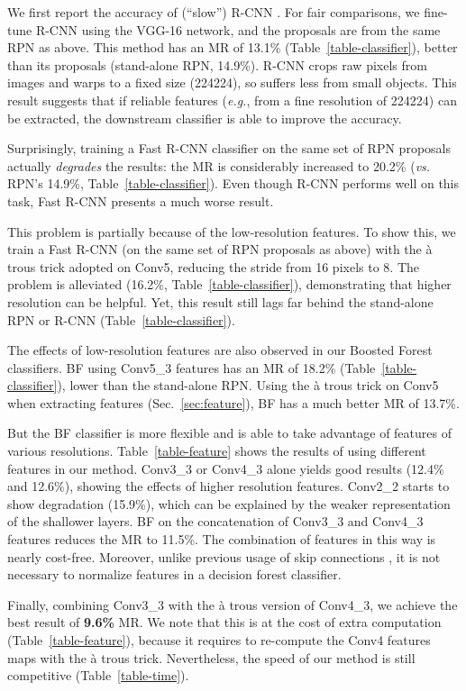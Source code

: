 \documentclass[runningheads]{llncs}
\def\eg{\emph{e.g.}}
\def\vs{\emph{vs. }}
\begin{document}
We first report the accuracy of (``slow'') R-CNN \cite{girshick2014rich}. For fair comparisons, we fine-tune R-CNN using the VGG-16 network, and the proposals are from the same RPN as above. This method has an MR of 13.1\% (Table~\ref{table-classifier}), better than its proposals (stand-alone RPN, 14.9\%). R-CNN crops raw pixels from images and warps to a fixed size (224224), so suffers less from small objects.
This result suggests that if reliable features (\eg, from a fine resolution of 224224) can be extracted, the downstream classifier is able to improve the accuracy. 

Surprisingly, training a Fast R-CNN classifier on the same set of RPN proposals actually \textit{degrades} the results: the MR is considerably increased to 20.2\% (\vs RPN's 14.9\%, Table~\ref{table-classifier}). Even though R-CNN performs well on this task, Fast R-CNN presents a much worse result.

This problem is partially because of the low-resolution features. To show this, we train a Fast R-CNN (on the same set of RPN proposals as above) with the \`a trous trick adopted on Conv5, reducing the stride from 16 pixels to 8. The problem is alleviated (16.2\%, Table~\ref{table-classifier}), demonstrating that higher resolution can be helpful. Yet, this result still lags far behind the stand-alone RPN or R-CNN (Table~\ref{table-classifier}).

The effects of low-resolution features are also observed in our Boosted Forest classifiers. BF using Conv5\_3 features has an MR of 18.2\% (Table~\ref{table-classifier}), lower than the stand-alone RPN. Using the \`a trous trick on Conv5 when extracting features (Sec.~\ref{sec:feature}), BF has a much better MR of 13.7\%.

But the BF classifier is more flexible and is able to take advantage of features of various resolutions. Table~\ref{table-feature} shows the results of using different features in our method.
Conv3\_3 or Conv4\_3 alone yields good results (12.4\% and 12.6\%), showing the effects of higher resolution features. Conv2\_2 starts to show degradation (15.9\%), which can be explained by the weaker representation of the shallower layers. 
BF on the concatenation of Conv3\_3 and Conv4\_3 features reduces the MR to 11.5\%. The combination of features in this way is nearly cost-free. Moreover, unlike previous usage of skip connections \cite{liu2015parsenet}, it is not necessary to normalize features in a decision forest classifier. 

Finally, combining Conv3\_3 with the \`a trous version of Conv4\_3, we achieve the best result of \textbf{9.6\%} MR. We note that this is at the cost of extra computation (Table~\ref{table-feature}), because it requires to re-compute the Conv4 features maps with the \`a trous trick. Nevertheless, the speed of our method is still competitive (Table~\ref{table-time}).
\end{document}
